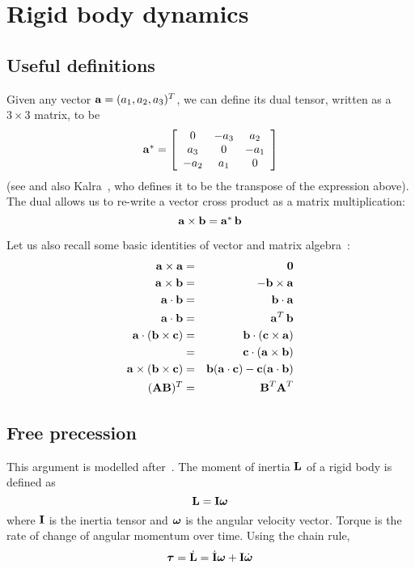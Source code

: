 \section{Rigid body dynamics\label{rigidBodyAppendix}}
\subsection{Useful definitions}

Given any vector $\ve{a} = (a_1, a_2, a_3)^T$, we can define its dual
tensor, written as a $3\times3$ matrix, to be
\begin{equation}
\dual{\ve{a}} = \left[\begin{array}{ccc}
    0 & -a_3 & a_2 \\ a_3 & 0 & -a_1 \\ -a_2 & a_1 & 0
    \end{array}\right]
\end{equation}
(see \cite{RHB:02,BaraffWitkin:97} and also Kalra~\cite{Kalra:95}, who defines it to be
the transpose of the expression above).
The dual allows us to re-write a vector cross product as a matrix multiplication:
\begin{equation}
\ve{a}\times\ve{b} = \dual{\ve{a}}\,\ve{b}
\end{equation}

Let us also recall some basic identities of vector and matrix algebra~\cite{RHB:02}:
\begin{eqnarray*}
\ve{a}\times\ve{a} & = & \ve{0} \\
\ve{a}\times\ve{b} & = & -\ve{b}\times\ve{a} \\
\ve{a}\cdot\ve{b} & = & \ve{b}\cdot\ve{a} \\
\ve{a}\cdot\ve{b} & = & \ve{a}^T\,\ve{b} \\
\ve{a}\cdot(\ve{b}\times\ve{c}) & = & \ve{b}\cdot(\ve{c}\times\ve{a}) \\
    & = & \ve{c}\cdot(\ve{a}\times\ve{b}) \\
\ve{a}\times(\ve{b}\times\ve{c}) & = &
    \ve{b}(\ve{a}\cdot\ve{c}) - \ve{c}(\ve{a}\cdot\ve{b}) \\
(\m{A}\m{B})^T & = & \m{B}^T\m{A}^T
\end{eqnarray*}


\subsection{Free precession\label{correctBrettAppendix}}

This argument is modelled after~\cite{Ruf:02}. The moment of inertia $\ve{L}$ of a rigid
body is defined as
\begin{equation}
\label{correctBrett1}
\ve{L} = \m{I}\ve{\omega}
\end{equation}
where $\m{I}$ is the inertia tensor and $\ve{\omega}$ is the angular velocity vector.
Torque is the rate of change of angular momentum over time. Using the chain rule,
\begin{equation}
\label{correctBrett2}
\ve{\tau} = \dot{\ve{L}} = \dot{\m{I}}\ve{\omega} + \m{I}\dot{\ve{\omega}}
\end{equation}

